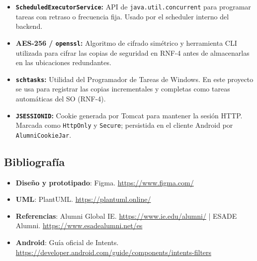 \documentclass{report}
\begin{document}
\begin{itemize}
    \item \textbf{\texttt{ScheduledExecutorService}:} API de \texttt{java.util.concurrent} para programar tareas con retraso o frecuencia fija. Usado por el scheduler interno del backend.
    \item \textbf{AES-256 / \texttt{openssl}:} Algoritmo de cifrado simétrico y herramienta CLI utilizada para cifrar las copias de seguridad en RNF-4 antes de almacenarlas en las ubicaciones redundantes.
    \item \textbf{\texttt{schtasks}:} Utilidad del Programador de Tareas de Windows. En este proyecto se usa para registrar las copias incrementales y completas como tareas automáticas del SO (RNF-4).
    \item \textbf{\texttt{JSESSIONID}:} Cookie generada por Tomcat para mantener la sesión HTTP. Marcada como \texttt{HttpOnly} y \texttt{Secure}; persistida en el cliente Android por \texttt{AlumniCookieJar}.
\end{itemize}

\subsection{Bibliografía}
\begin{itemize}
    \item \textbf{Diseño y prototipado}: Figma. \url{https://www.figma.com/}
    \item \textbf{UML}: PlantUML. \url{https://plantuml.online/}
    \item \textbf{Referencias}: Alumni Global IE. \url{https://www.ie.edu/alumni/} | ESADE Alumni. \url{https://www.esadealumni.net/es}
    \item \textbf{Android}: Guía oficial de Intents. \url{https://developer.android.com/guide/components/intents-filters}
\end{itemize}
\end{document}

